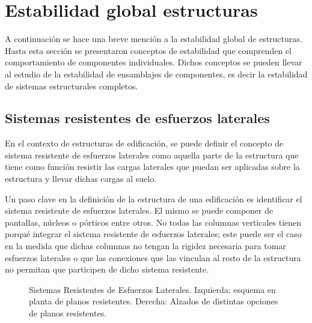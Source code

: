 %
%
%

\section{Estabilidad global estructuras}
A continuación se hace una breve mención a la estabilidad global de estructuras. Hasta esta sección se presentaron conceptos de estabilidad que comprenden el comportamiento de componentes individuales. Dichos conceptos se pueden llevar al estudio de la estabilidad de ensamblajes de componentes, es decir la estabilidad de sistemas estructurales completos.

\subsection{Sistemas resistentes de esfuerzos laterales}
En el contexto de estructuras de edificación, se puede definir el concepto de sistema resistente de esfuerzos laterales como aquella parte de la estructura que tiene como función resistir las cargas laterales que puedan ser aplicadas sobre la estructura y llevar dichas cargas al suelo.

Un paso clave en la definición de la estructura de una edificación es identificar el sistema resistente de esfuerzos laterales. El mismo se puede componer de pantallas, núcleos o pórticos entre otros. No todas las columnas verticales tienen porqué integrar el sistema resistente de esfuerzos laterales; este puede ser el caso en la medida que dichas columnas no tengan la rigidez necesaria para tomar esfuerzos laterales o que las conexiones que las vinculan al resto de la estructura no permitan que participen de dicho sistema resistente.

\begin{figure}[htb]
  \centering
  \def\svgwidth{\textwidth}

	\caption{Sistemas Resistentes de Esfuerzos Laterales. Izquierda: esquema en planta de planos resistentes. Derecha: Alzados de distintas opciones de planos resistentes.}
	\label{fig:EsqNucleos}
\end{figure}

